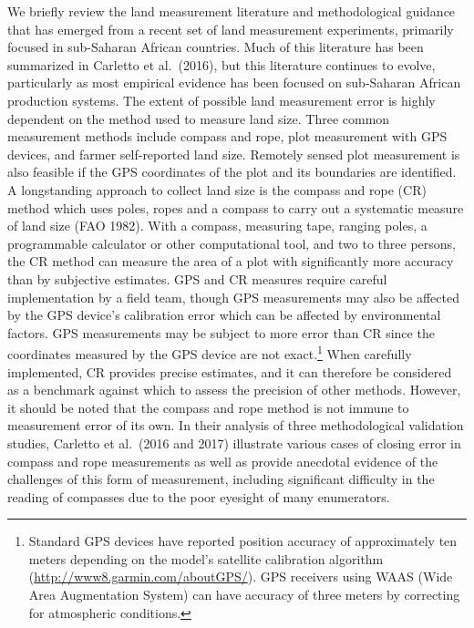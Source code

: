 \documentclass[
]{book}
\begin{document}
We briefly review the land measurement literature and methodological guidance that has emerged from a recent set of land measurement experiments, primarily focused in sub-Saharan African countries. Much of this literature has been summarized in Carletto et al.~(2016), but this literature continues to evolve, particularly as most empirical evidence has been focused on sub-Saharan African production systems. The extent of possible land measurement error is highly dependent on the method used to measure land size. Three common measurement methods include compass and rope, plot measurement with GPS devices, and farmer self-reported land size. Remotely sensed plot measurement is also feasible if the GPS coordinates of the plot and its boundaries are identified. A longstanding approach to collect land size is the compass and rope (CR) method which uses poles, ropes and a compass to carry out a systematic measure of land size (FAO 1982). With a compass, measuring tape, ranging poles, a programmable calculator or other computational tool, and two to three persons, the CR method can measure the area of a plot with significantly more accuracy than by subjective estimates. GPS and CR measures require careful implementation by a field team, though GPS measurements may also be affected by the GPS device's calibration error which can be affected by environmental factors. GPS measurements may be subject to more error than CR since the coordinates measured by the GPS device are not exact.\footnote{Standard GPS devices have reported position accuracy of approximately ten meters depending on the model's satellite calibration algorithm (\url{http://www8.garmin.com/aboutGPS/}). GPS receivers using WAAS (Wide Area Augmentation System) can have accuracy of three meters by correcting for atmospheric conditions.} When carefully implemented, CR provides precise estimates, and it can therefore be considered as a benchmark against which to assess the precision of other methods. However, it should be noted that the compass and rope method is not immune to measurement error of its own. In their analysis of three methodological validation studies, Carletto et al.~(2016 and 2017) illustrate various cases of closing error in compass and rope measurements as well as provide anecdotal evidence of the challenges of this form of measurement, including significant difficulty in the reading of compasses due to the poor eyesight of many enumerators.
\end{document}
